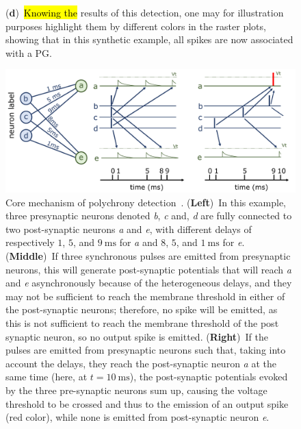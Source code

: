 \documentclass[brainsci, %
               review,accept,pdftex,moreauthors
               ]{Definitions/mdpi}
\newcommand{\ms}{\si{\milli\second}}%
\begin{document}
\begin{figure}[H]
{    %
    { (\textbf{d})}~\hl{Knowing the} %
 results of this detection, one may for illustration purposes highlight them by different colors in the raster plots, showing that in this synthetic example, all spikes are now associated with a PG. 
     }
  \label{fig:THC} %
\end{figure}

\begin{figure}[H]%
  \includegraphics[width=0.980\linewidth]{figures/izhikevich.pdf}%
    \caption{
      Core mechanism of polychrony detection~\citep{izhikevich_polychronization_2006}.
       {(\textbf{Left})}~In this example, three presynaptic neurons denoted \textit{b}, \textit{c} and, \textit{d} are fully connected to two post-synaptic neurons \textit{a} and \textit{e}, with different delays of respectively $1$, $5$, and $9~\ms$ for \textit{a} and  $8$, $5$, and $1~\ms$ for \textit{e}. {(\textbf{Middle})}~If three synchronous pulses are emitted from presynaptic neurons, this will generate post-synaptic potentials that will reach \textit{a} and \textit{e} asynchronously because of the heterogeneous delays, and they may not be sufficient to reach the membrane threshold in either of the post-synaptic neurons; therefore, no spike will be emitted, as this is not sufficient to reach the membrane threshold of the post synaptic neuron, so no output spike is emitted.
    {(\textbf{Right})}~If the pulses are emitted from presynaptic neurons such that, taking into account the delays, they reach the post-synaptic neuron \textit{a} at the same time (here, at $t=10~\ms$),  the post-synaptic potentials evoked by the three pre-synaptic neurons sum up, causing the voltage threshold to be crossed and thus to the emission of an output spike (red color), while none is emitted from post-synaptic neuron \textit{e}.
     }
  \label{fig:izhikevich}
\end{figure}
%
%
\end{document}
